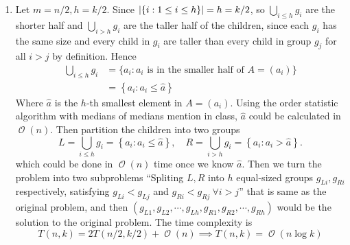 \documentclass[12pt, a4paper]{article}
\DeclarePairedDelimiter{\abs}{\lvert}{\rvert}
\newcommand{\opord}{\operatorname{\mathcal{O}}}
\newcommand{\ord}[1]{\opord\left(#1\right)}
\begin{document}
\begin{enumerate}
  \item 
Let $m = n/2, h = k/2$. Since $\abs{\{i: 1 \leq i \leq h\}} = h = k/2$, 
so $\bigcup\limits_{i \leq h} g_i$ are the shorter half and 
$\bigcup\limits_{i > h} g_i$ are the taller half of the children, since each $g_i$ has the same size and 
every child in $g_i$ are taller than every child in group $g_j$ for all $i > j$ by definition.
Hence
\begin{align*}
  \bigcup_{i \leq h} g_i &= \{a_i: a_i \text{ is in the smaller half of } A = (a_i)\} \\
  &= \left\{ a_i : a_i \leq \hat{a} \right\}
\end{align*}
Where $\hat{a}$ is the $h$-th smallest element in $A = (a_i)$. Using the order statistic algorithm with 
medians of medians mention in class, $\hat{a}$ could be calculated in $\ord{n}$. Then partition the 
children into two groups
\[ L = \bigcup_{i \leq h} g_i = \left\{ a_i : a_i \leq \hat{a} \right\}, \quad 
R = \bigcup_{i > h} g_i = \left\{ a_i : a_i > \hat{a} \right\}.\]
which could be done in $\ord{n}$ time once we know $\hat{a}$. Then we turn the problem into two subproblems ``Spliting $L, R$ into $h$ equal-sized groups $g_{Li}, g_{Ri}$ respectively, satisfying $g_{Li} < g_{Lj}$ and 
$g_{Ri} < g_{Rj} \  \forall i > j$'' that is same as the original problem, 
and then $(g_{L1}, g_{L2}, \cdots, g_{Lh}, g_{R1}, g_{R2}, \cdots, g_{Rh})$
would be the solution to the original problem. The time complexity is
\[ T(n, k) = 2T( n/2, k/2 ) + \ord{n} \implies T(n, k) = \ord{n \log k}\]


\end{enumerate}
\end{document}
